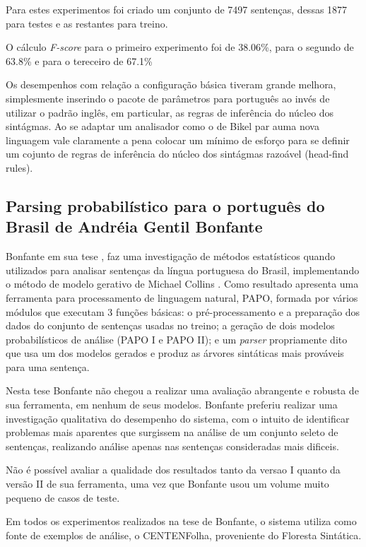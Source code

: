 Para estes experimentos foi criado um conjunto de 7497 sentenças, dessas 1877 para testes e as restantes para treino.

O cálculo \emph{F-score} para o primeiro experimento foi de 38.06{\%}, para o segundo de 63.8{\%} e para o tereceiro de 67.1{\%} 

Os desempenhos com relação a configuração básica tiveram grande melhora, simplesmente inserindo o pacote de parâmetros para português ao invés de utilizar o padrão inglês, em particular, as regras de inferência do núcleo dos sintágmas. Ao se adaptar um analisador como o de Bikel par auma nova linguagem vale claramente a pena colocar um mínimo de esforço para se definir um cojunto de regras de inferência do núcleo dos sintágmas razoável (head-find rules).

\subsection{Parsing probabilístico para o português do Brasil de Andréia Gentil Bonfante} %
\label{sec:bonfante}

Bonfante em sua tese \cite{bonfante03}, faz uma investigação de métodos estatísticos quando utilizados para analisar sentenças da língua portuguesa do Brasil, implementando o método de modelo gerativo de Michael Collins \cite{collins99}. Como resultado apresenta uma ferramenta para processamento de linguagem natural, PAPO, formada por vários módulos que executam 3 funções básicas: o pré-processamento e a preparação dos dados do conjunto de sentenças usadas no treino; a geração de dois modelos probabilísticos de análise (PAPO I e PAPO II); e um \emph{parser} propriamente dito que usa um dos modelos gerados e produz as árvores sintáticas mais prováveis para uma sentença.

Nesta tese Bonfante não chegou a realizar uma avaliação abrangente e robusta de sua ferramenta, em nenhum de seus modelos. Bonfante preferiu realizar uma investigação qualitativa do desempenho do sistema, com o intuito de identificar problemas mais aparentes que surgissem na análise de um conjunto seleto de sentenças, realizando análise apenas nas sentenças consideradas mais dificeis.

Não é possível avaliar a qualidade dos resultados tanto da versao I quanto da versão II de sua ferramenta, uma vez que Bonfante usou um volume muito pequeno de casos de teste.

Em todos os experimentos realizados na tese de Bonfante, o sistema utiliza como fonte de exemplos de análise, o CENTENFolha, proveniente do Floresta Sintática.


